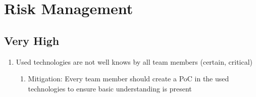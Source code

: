 \section{Risk Management}

\subsection{Very High}
\begin{enumerate}
    \item Used technologies are not well knows by all team members (certain, critical) 
    \begin{enumerate}
        \item Mitigation: Every team member should create a PoC in the used technologies to ensure basic understanding is present 
    \end{enumerate}
\end{enumerate}

